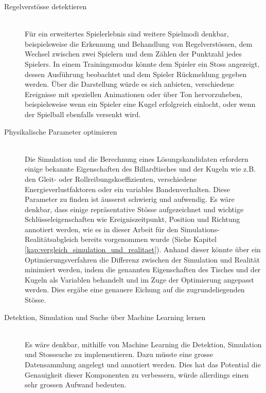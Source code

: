 \begin{description}
    \item[Regelverstösse detektieren]\mbox{} \\
    Für ein erweitertes Spielerlebnis sind weitere Spielmodi denkbar, beispielsweise die Erkennung und Behandlung von
    Regelverstössen, dem Wechsel zwischen zwei Spielern und dem Zählen der Punktzahl jedes Spielers.
    In einem Trainingsmodus könnte dem Spieler ein Stoss angezeigt, dessen Ausführung beobachtet und dem Spieler
    Rückmeldung gegeben werden.
    Über die Darstellung würde es sich anbieten, verschiedene Ereignisse mit speziellen Animationen oder über Ton hervorzuheben,
    beispielsweise wenn ein Spieler eine Kugel erfolgreich einlocht, oder wenn der Spielball ebenfalls versenkt wird.
    \item[Physikalische Parameter optimieren]\mbox{} \\
    Die Simulation und die Berechnung eines Lösungskandidaten erfordern einige bekannte Eigenschaften des Billardtisches und
    der Kugeln wie z.B. den Gleit- oder Rollreibungskoeffizienten, verschiedene Energieverlustfaktoren oder ein variables
    Bandenverhalten. Diese Parameter zu finden ist äusserst schwierig und aufwendig. Es wäre denkbar, dass einige repräsentative
    Stösse aufgezeichnet und wichtige Schlüsseleigenschaften wie Ereigniszeitpunkt, Position und Richtung annotiert werden,
    wie es in dieser Arbeit für den Simulations- Realitätsabgleich bereits vorgenommen
    wurde (Siehe Kapitel \ref{kap:vergleich_simulation_und_realitaet}). Anhand dieser könnte über ein Optimierungsverfahren
    die Differenz zwischen der Simulation und Realität minimiert werden, indem die genannten Eigenschaften des Tisches und
    der Kugeln als Variablen behandelt und im Zuge der Optimierung angepasst werden. Dies ergäbe eine genauere Eichung auf
    die zugrundeliegenden Stösse.
    \item[Detektion, Simulation und Suche über Machine Learning lernen]\mbox{} \\
    Es wäre denkbar, mithilfe von Machine Learning die Detektion, Simulation und Stosssuche zu implementieren.
    Dazu müsste eine grosse Datensammlung angelegt und annotiert werden.
    Dies hat das Potential die Genauigkeit dieser Komponenten zu verbessern, würde allerdings einen sehr grossen Aufwand bedeuten.
\end{description}
